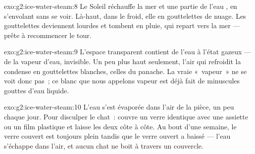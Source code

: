 \begin{solution}{exo:g2:ice-water-steam:8}
Le Soleil réchauffe la mer et une partie de l'eau , en
s'envolant sans se voir. Là-haut, dans le froid, elle  en
gouttelettes de nuage. Les gouttelettes deviennent lourdes et tombent
en pluie, qui repart vers la mer --- prête à recommencer le tour.
\end{solution}

\begin{solution}{exo:g2:ice-water-steam:9}
L'espace transparent contient de l'eau à l'état gazeux --- de la
vapeur d'eau, invisible. Un peu plus haut seulement, l'air qui
refroidit la condense en gouttelettes blanches, celles du panache. La
vraie «~vapeur~» ne se voit donc pas~; ce blanc que nous appelons
vapeur est déjà fait de minuscules gouttes d'eau liquide.
\end{solution}

\begin{solution}{exo:g2:ice-water-steam:10}
L'eau s'est évaporée dans l'air de la pièce, un peu chaque jour. Pour
disculper le chat~: couvre un verre identique avec une assiette ou un
film plastique et laisse les deux côte à côte. Au bout d'une semaine,
le verre couvert est toujours plein tandis que le verre ouvert a
baissé --- l'eau s'échappe dans l'air, et aucun chat ne boit à
travers un couvercle.
\end{solution}
